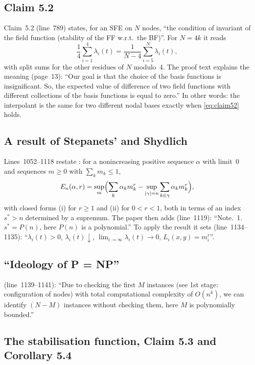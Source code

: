 \documentclass[11pt,a4paper]{article}
\newcommand{\paperline}[1]{(line~#1)}
\begin{document}
\subsection{Claim 5.2}

Claim~5.2 \paperline{789} states, for an SFE on $N$ nodes, ``the condition of invariant of the field function (stability of the FF w.r.t.\ the BF)''. For $N=4k$ it reads
\begin{equation}
\frac14\sum_{i=1}^4\lambda_i(t)=\frac1{N-4}\sum_{i=5}^N\lambda_i(t),
\label{eq:claim52}
\end{equation}
with split sums for the other residues of $N$ modulo~4. The proof text explains the meaning (page~13): ``Our goal is that the choice of the basis functions is insignificant. So, the expected value of difference of two field functions with different collections of the basis functions is equal to zero.'' In other words: the interpolant is the same for two different nodal bases exactly when \eqref{eq:claim52} holds.

\subsection{A result of Stepanets' and Shydlich}

Lines~1052--1118 restate \cite{stepanets}: for a nonincreasing positive sequence $\alpha$ with limit~0 and sequences $m\ge 0$ with $\sum_k m_k\le 1$,
\[
E_n(\alpha,r)=\sup_{m}\Bigl(\sum_{k}\alpha_k m_k^r-\sup_{|\gamma|=n}\sum_{k\in\gamma}\alpha_k m_k^r\Bigr),
\]
with closed forms (i) for $r\ge 1$ and (ii) for $0<r<1$, both in terms of an index $s^*>n$ determined by a supremum. The paper then adds \paperline{1119}: ``Note.~1. $s^*=P(n)$, here $P(n)$ is a polynomial.'' To apply the result it sets \paperline{1134--1135}: ``$\lambda_i(t)>0$, $\lambda_i(t)\downarrow$, $\lim_{i\to\infty}\lambda_i(t)\to 0$, $L_i(x,y)=m_i^r$''.

\subsection{``Ideology of P = NP''}

\paperline{1139--1141}: ``Due to checking the first $M$ instances (see 1st stage: configuration of nodes) with total computational complexity of $O(n^k)$, we can identify $(N-M)$ instances without checking them, here $M$ is polynomially bounded.''

\subsection{The stabilisation function, Claim 5.3 and Corollary 5.4}
\end{document}

